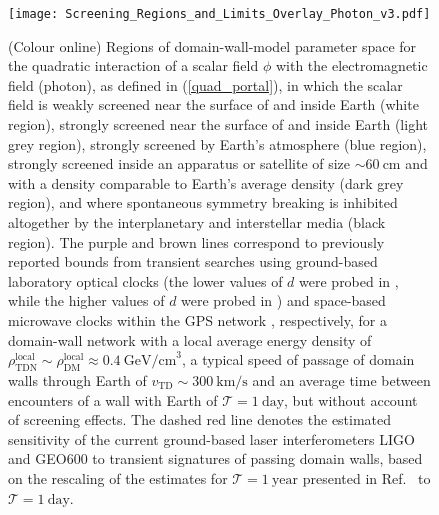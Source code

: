 \documentclass[aps,prd,onecolumn,nofootinbib]{revtex4-2} %
\begin{document}
\begin{figure}[t!]
\centering
\texttt{[image: Screening\_Regions\_and\_Limits\_Overlay\_Photon\_v3.pdf]}
\caption{ \normalsize (Colour online) 
Regions of domain-wall-model parameter space for the quadratic interaction of a scalar field $\phi$ with the electromagnetic field (photon), as defined in (\ref{quad_portal}), in which the scalar field is weakly screened near the surface of and inside Earth (white region), 
strongly screened near the surface of and inside Earth (light grey region), 
strongly screened by Earth's atmosphere (blue region), 
strongly screened inside an apparatus or satellite of size $\sim 60~\textrm{cm}$ and with a density comparable to Earth's average density (dark grey region), 
and where spontaneous symmetry breaking is inhibited altogether by the interplanetary and interstellar media (black region). 
The purple and brown lines correspond to previously reported bounds from transient searches using ground-based laboratory optical clocks \cite{Wcislo_2016_TDM-cavity,Roberts_2019_TDM-clocks} (the lower values of $d$ were probed in \cite{Wcislo_2016_TDM-cavity}, while the higher values of $d$ were probed in \cite{Roberts_2019_TDM-clocks}) and space-based microwave clocks within the GPS network \cite{Roberts_2017_TDM-GPS}, respectively, for a domain-wall network with a local average energy density of $\rho_\textrm{TDN}^\textrm{local} \sim \rho_\textrm{DM}^\textrm{local} \approx 0.4~\textrm{GeV/cm}^3$, a typical speed of passage of domain walls through Earth of $v_\textrm{TD} \sim 300~\textrm{km/s}$ and an average time between encounters of a wall with Earth of $\mathcal{T} = 1~\textrm{day}$, but without account of screening effects. 
The dashed red line denotes the estimated sensitivity of the current ground-based laser interferometers LIGO and GEO600 to transient signatures of passing domain walls, based on the rescaling of the estimates for $\mathcal{T} = 1~\textrm{year}$ presented in Ref.~\cite{Stadnik_2019_DM-LIFO} to $\mathcal{T} = 1~\textrm{day}$. 
}
\label{Fig:Screening_region+clock_transients-overlay}
\end{figure}
\end{document}
